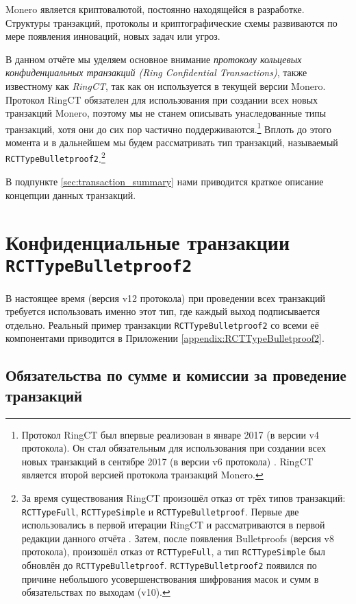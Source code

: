 Monero является криптовалютой, постоянно находящейся в разработке. Структуры транзак\-ций, протоколы и криптографические схемы развиваются по мере появления инноваций, новых задач или угроз.

В данном отчёте мы уделяем основное внимание {\em протоколу кольцевых конфиденциальных транзакций (Ring Confidential Transactions)}, также известному как {\em RingCT}, так как он исполь\-зуется в текущей версии Monero. Протокол RingCT обязателен для использования при созда\-нии всех новых транзакций Monero, поэтому мы не станем описывать унаследованные типы транзакций, хотя они до сих пор частично поддерживаются.\footnote{Протокол RingCT был впервые реализован в январе 2017 (в версии v4 протокола). Он стал обязательным для использования при создании всех новых транзакций в сентябре 2017 (в версии v6 протокола) \cite{ringct-dates}. RingCT является второй версией протокола транзакций Monero.} Вплоть до этого момента и в дальнейшем мы будем рассматривать тип транзакций, называемый {\tt RCTTypeBulletproof2}.\footnote{За время существования RingCT произошёл отказ от трёх типов транзакций: {\tt RCTTypeFull}, {\tt RCTTypeSimple} и {\tt RCTTypeBulletproof}. Первые две использовались в первой итерации RingCT и рассматриваются в первой редакции данного отчёта \cite{ztm-1}. Затем, после появления Bulletproofs (версия v8 протокола), произошёл отказ от {\tt RCTTypeFull}, а тип {\tt RCTTypeSimple} был обновлён до {\tt RCTTypeBulletproof}. {\tt RCTTypeBulletproof2} появился по причине небольшого усовершенствования шифрования масок и сумм в обязательствах по выходам (v10).}

В подпункте \ref{sec:transaction_summary} нами приводится краткое описание концепции данных транзакций.



\section{Конфиденциальные транзакции {\tt RCTTypeBulletproof2}}
\label{sec:RCTTypeBulletproof2}

В настоящее время (версия v12 протокола) при проведении всех транзакций требуется исполь\-зовать именно этот тип, где каждый выход подписывается отдельно. Реальный пример транзакции {\tt RCTTypeBulletproof2} со всеми её компонентами приводится в Приложении \ref{appendix:RCTTypeBulletproof2}.


\subsection{Обязательства по сумме и комиссии за проведение транзакций}
\label{sec:commitments-and-fees}

